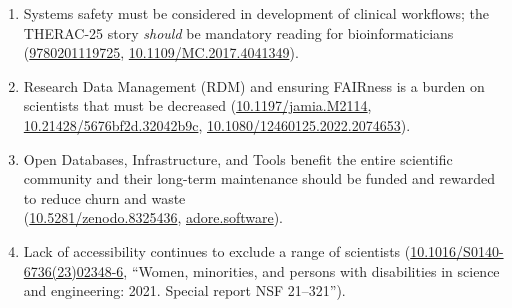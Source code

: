 \documentclass[School=EMC]{Dissertate}
\newcommand{\zz}[1]{{\footnotesize\ttfamily \href{https://doi.org/#1}{#1}}}
\newcommand{\zy}[1]{{\footnotesize\ttfamily \href{https://en.m.wikipedia.org/wiki/Special:BookSources?isbn=#1}{#1}}}
\newcommand{\zx}[1]{{\footnotesize\ttfamily \href{https://#1}{#1}}}
\begin{document}
\begin{enumerate}
\item Systems safety must be considered in development of clinical workflows; the THERAC-25 story \emph{should} be mandatory reading for bioinformaticians (\zy{9780201119725}, \zz{10.1109/MC.2017.4041349}).

\item Research Data Management (RDM) and ensuring FAIRness is a burden on scientists that must be decreased (\zz{10.1197/jamia.M2114}, \zz{10.21428/5676bf2d.32042b9c}, \zz{10.1080/12460125.2022.2074653}).


\item Open Databases, Infrastructure, and Tools benefit the entire scientific community and their long-term maintenance should be funded and rewarded to reduce churn and waste\ \\(\zz{10.5281/zenodo.8325436}, \zx{adore.software}).

\item Lack of accessibility continues to exclude a range of scientists (\zz{10.1016/S0140-6736(23)02348-6}, {\small``Women, minorities, and persons with disabilities in science and engineering: 2021. Special report NSF 21–321''}).


\end{enumerate}
\end{document}
